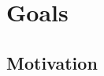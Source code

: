 \hypertarget{goals}{%
\chapter{Goals}\label{goals}}

\hypertarget{motivation}{%
\section{Motivation}\label{motivation}}
